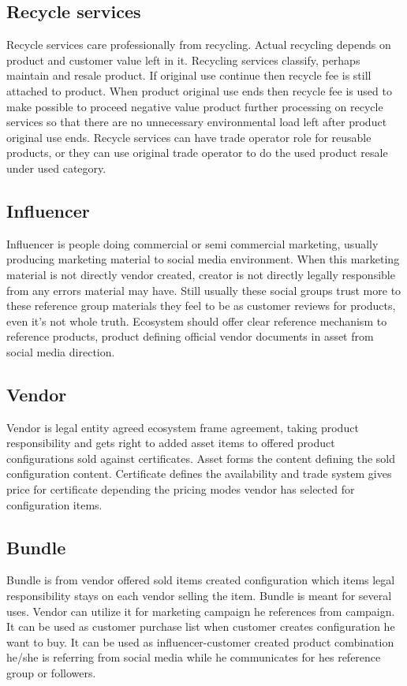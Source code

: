 \subsection{Recycle services}
\label{recycle_services}
Recycle services care professionally from recycling. Actual recycling depends on product and customer value left in it. Recycling services classify, perhaps maintain and resale product. If original use continue then recycle fee is still attached to product. When product original use ends then recycle fee is used to make possible to proceed negative value product further processing on recycle services so that there are no unnecessary environmental load left after product original use ends. Recycle services can have trade operator role for reusable products, or they can use original trade operator to do the used product resale under used category.

\subsection{Influencer}
\label{influencer}
Influencer is people doing commercial or semi commercial marketing, usually producing marketing material to social media environment. When this marketing material is not directly vendor created, creator is not directly legally responsible from any errors material may have. Still usually these social groups trust more to these reference group materials they feel to be as customer reviews for products, even it's not whole truth. Ecosystem should offer clear reference mechanism to reference products, product defining official vendor documents in asset from social media direction.

\subsection{Vendor}
\label{vendor}
Vendor is legal entity agreed ecosystem frame agreement, taking product responsibility and gets right to added asset items to offered product configurations sold against certificates. Asset forms the content defining the sold configuration content. Certificate defines the availability and trade system gives price for certificate depending the pricing modes vendor has selected for configuration items.

\subsection{Bundle}
\label{bundle}
Bundle is from vendor offered sold items created configuration which items legal responsibility stays on each vendor selling the item. Bundle is meant for several uses. Vendor can utilize it for marketing campaign he references from campaign. It can be used as customer purchase list when customer creates configuration he want to buy. It can be used as influencer-customer created product combination he/she is referring from social media while he communicates for hes reference group or followers.

